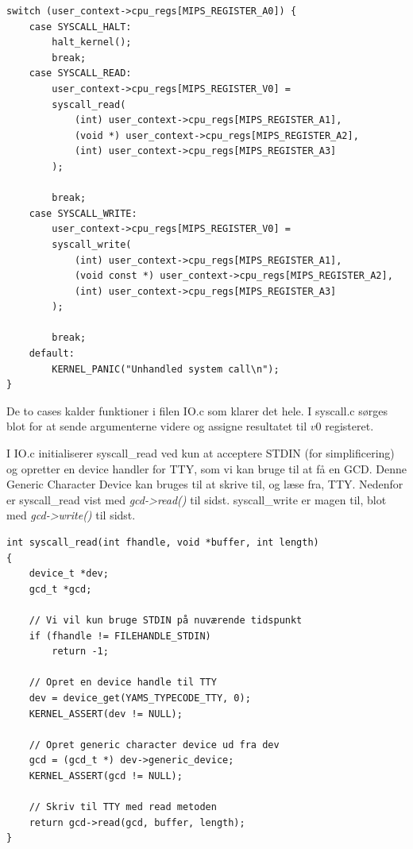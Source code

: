\documentclass[11pt]{article}
\begin{document}
\begin{lstlisting}[style=customc]
switch (user_context->cpu_regs[MIPS_REGISTER_A0]) {
    case SYSCALL_HALT:
        halt_kernel();
        break;
    case SYSCALL_READ:
        user_context->cpu_regs[MIPS_REGISTER_V0] =
        syscall_read(
            (int) user_context->cpu_regs[MIPS_REGISTER_A1],
            (void *) user_context->cpu_regs[MIPS_REGISTER_A2],
            (int) user_context->cpu_regs[MIPS_REGISTER_A3]
        );

        break;
    case SYSCALL_WRITE:
        user_context->cpu_regs[MIPS_REGISTER_V0] =
        syscall_write(
            (int) user_context->cpu_regs[MIPS_REGISTER_A1],
            (void const *) user_context->cpu_regs[MIPS_REGISTER_A2],
            (int) user_context->cpu_regs[MIPS_REGISTER_A3]
        );

        break;
    default:
        KERNEL_PANIC("Unhandled system call\n");
}
\end{lstlisting}

De to cases kalder funktioner i filen IO.c som klarer det hele. I syscall.c
sørges blot for at sende argumenterne videre og assigne resultatet til $v0$
registeret.

I IO.c initialiserer syscall\_read ved kun at acceptere STDIN (for simplificering)
og opretter en device handler for TTY, som vi kan bruge til at få en GCD. Denne
Generic Character Device kan bruges til at skrive til, og læse fra, TTY. Nedenfor
er syscall\_read vist med \emph{gcd->read()} til sidst. syscall\_write er magen til,
blot med \emph{gcd->write()} til sidst.

\begin{lstlisting}[style=customc]
int syscall_read(int fhandle, void *buffer, int length)
{
    device_t *dev;
    gcd_t *gcd;

    // Vi vil kun bruge STDIN på nuværende tidspunkt
    if (fhandle != FILEHANDLE_STDIN)
        return -1;

    // Opret en device handle til TTY
    dev = device_get(YAMS_TYPECODE_TTY, 0);
    KERNEL_ASSERT(dev != NULL);

    // Opret generic character device ud fra dev
    gcd = (gcd_t *) dev->generic_device;
    KERNEL_ASSERT(gcd != NULL);

    // Skriv til TTY med read metoden
    return gcd->read(gcd, buffer, length);
}
\end{lstlisting}
\end{document}

